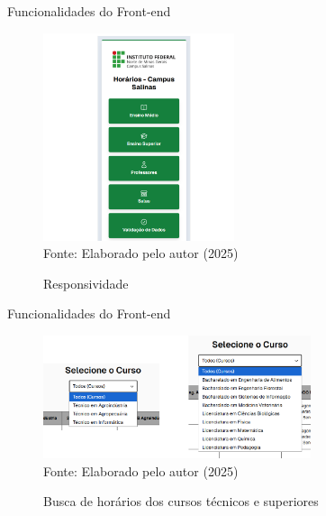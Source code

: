 \begin{frame}{Funcionalidades do Front-end}
    \begin{figure}
        \centering
        \vspace{-0.5cm}
        \caption{Responsividade}
        \vspace{-0.2cm}
        \includegraphics[width=0.5\textwidth]{figuras/front-16.png}
        \\ %
        \small Fonte: Elaborado pelo autor (2025)
    \end{figure}
\end{frame}

\begin{frame}{Funcionalidades do Front-end}
    \begin{figure}
        \centering
        \vspace{-0.5cm}
        \caption{Busca de horários dos cursos técnicos e superiores}
        \vspace{-0.2cm}
        \includegraphics[width=0.7\textwidth]{figuras/front-17.png}
        \\ %
        \small Fonte: Elaborado pelo autor (2025)
    \end{figure}
\end{frame}

